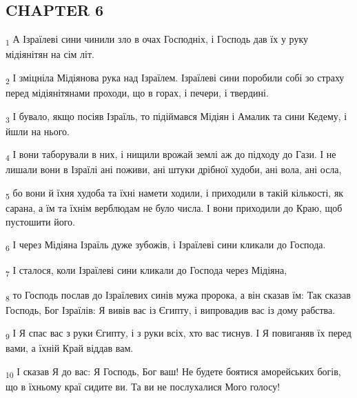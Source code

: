 \subsection{CHAPTER 6}
\begin{tcolorbox}
\textsubscript{1} А Ізраїлеві сини чинили зло в очах Господніх, і Господь дав їх у руку мідіянітян на сім літ.
\end{tcolorbox}
\begin{tcolorbox}
\textsubscript{2} І зміцніла Мідіянова рука над Ізраїлем. Ізраїлеві сини поробили собі зо страху перед мідіянітянами проходи, що в горах, і печери, і твердині.
\end{tcolorbox}
\begin{tcolorbox}
\textsubscript{3} І бувало, якщо посіяв Ізраїль, то підіймався Мідіян і Амалик та сини Кедему, і йшли на нього.
\end{tcolorbox}
\begin{tcolorbox}
\textsubscript{4} І вони таборували в них, і нищили врожай землі аж до підходу до Гази. І не лишали вони в Ізраїлі ані поживи, ані штуки дрібної худоби, ані вола, ані осла,
\end{tcolorbox}
\begin{tcolorbox}
\textsubscript{5} бо вони й їхня худоба та їхні намети ходили, і приходили в такій кількості, як сарана, а їм та їхнім верблюдам не було числа. І вони приходили до Краю, щоб пустошити його.
\end{tcolorbox}
\begin{tcolorbox}
\textsubscript{6} І через Мідіяна Ізраїль дуже зубожів, і Ізраїлеві сини кликали до Господа.
\end{tcolorbox}
\begin{tcolorbox}
\textsubscript{7} І сталося, коли Ізраїлеві сини кликали до Господа через Мідіяна,
\end{tcolorbox}
\begin{tcolorbox}
\textsubscript{8} то Господь послав до Ізраїлевих синів мужа пророка, а він сказав їм: Так сказав Господь, Бог Ізраїлів: Я вивів вас із Єгипту, і випровадив вас із дому рабства.
\end{tcolorbox}
\begin{tcolorbox}
\textsubscript{9} І Я спас вас з руки Єгипту, і з руки всіх, хто вас тиснув. І Я повиганяв їх перед вами, а їхній Край віддав вам.
\end{tcolorbox}
\begin{tcolorbox}
\textsubscript{10} І сказав Я до вас: Я Господь, Бог ваш! Не будете боятися аморейських богів, що в їхньому краї сидите ви. Та ви не послухалися Мого голосу!
\end{tcolorbox}

